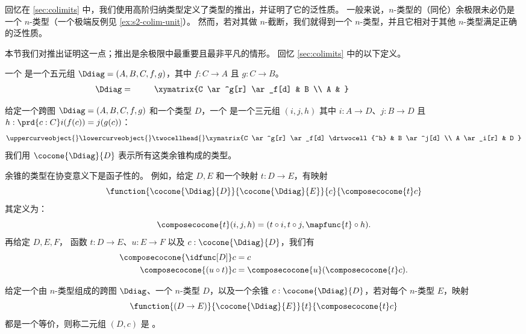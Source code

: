 回忆在 \cref{sec:colimits} 中，我们使用高阶归纳类型定义了类型的推出，并证明了它的泛性质。
一般来说，$n$-类型的（同伦）余极限未必仍是一个 $n$-类型（一个极端反例见 \cref{ex:s2-colim-unit}）。
然而，若对其做 $n$-截断，我们就得到一个 $n$-类型，并且它相对于其他 $n$-类型满足正确的泛性质。

本节我们对推出证明这一点；推出是余极限中最重要且最非平凡的情形。
回忆 \cref{sec:colimits} 中的以下定义。

\begin{defn}
  一个  %
  是一个五元组 $\Ddiag=(A,B,C,f,g)$，其中 %
  $f:C\to{}A$ 且 $g:C\to{}B$。
  \[\Ddiag=\quad\vcenter{\xymatrix{C \ar^g[r] \ar_f[d] & B \\ A & }}\]
\end{defn}

\begin{defn}
  给定一个跨图 $\Ddiag=(A,B,C,f,g)$ 和一个类型 $D$，一个 %
  是一个三元组 $(i, j, h)$
  其中 $i:A\to{}D$、$j:B\to{}D$ 且 $h : \prd{c:C}i(f(c))=j(g(c))$：
  \[\uppercurveobject{{ }}\lowercurveobject{{ }}\twocellhead{{ }}
  \xymatrix{C \ar^g[r] \ar_f[d] \drtwocell{^h} & B \ar^j[d] \\ A \ar_i[r] & D
  }\]
  我们用 $\cocone{\Ddiag}{D}$ 表示所有这类余锥构成的类型。
\end{defn}

余锥的类型在协变意义下是函子性的。
例如，给定 $D,E$ %
和一个映射 $t:D\to{}E$，有映射
  \[\function{\cocone{\Ddiag}{D}}{\cocone{\Ddiag}{E}}{c}{\composecocone{t}c}\]
  其定义为：
  \[\composecocone{t}(i,j,h)=(t\circ{}i,t\circ{}j,\mapfunc{t}\circ{}h).\]
再给定 $D,E,F$， %
函数 $t:D\to{}E$、$u:E\to{}F$ 以及 $c:\cocone{\Ddiag}{D}$，我们有
\begin{align}
  \composecocone{\idfunc[D]}c &= c \label{eq:composeconeid}\\
  \composecocone{(u\circ{}t)}c&=\composecocone{u}(\composecocone{t}c). \label{eq:composeconefunc}
\end{align}

\begin{defn}
  给定一个由 $n$-类型组成的跨图 $\Ddiag$、一个 $n$-类型 $D$，以及一个余锥
  $c:\cocone{\Ddiag}{D}$，若对每个 $n$-类型 $E$，映射
  \[\function{(D\to{}E)}{\cocone{\Ddiag}{E}}{t}{\composecocone{t}c}\]
  都是一个等价，则称二元组 $(D,c)$ 是 
  。
\end{defn}


